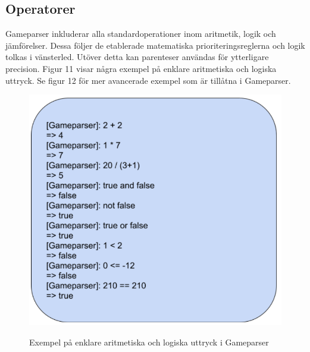 \documentclass{Dokumentmall}
\begin{document}
\subsection{Operatorer}
Gameparser inkluderar alla standardoperationer inom aritmetik, logik och jämförelser. Dessa följer de etablerade matematiska prioriteringsreglerna och logik tolkas i vänsterled. Utöver detta kan parenteser användas för ytterligare precision. Figur 11 visar några exempel på enklare aritmetiska och logiska uttryck. Se figur 12 för mer avancerade exempel som är tillåtna i Gameparser.
\begin{figure}[h!]
  \centering
  \includegraphics[scale = 0.65]{Images/Figur11.png}
  \label{}
  \caption{Exempel på enklare aritmetiska och logiska uttryck i Gameparser}
\end{figure}
\end{document}
